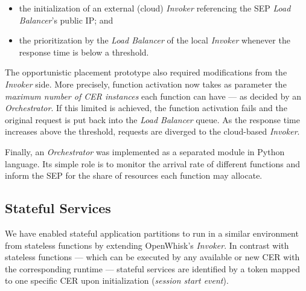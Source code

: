 \begin{itemize}
    \item the initialization of an external (cloud) \textit{Invoker} referencing the SEP \textit{Load Balancer}'s public IP; and
    
    \item the prioritization by the \textit{Load Balancer} of the local \textit{Invoker} whenever the response time is below a threshold. %
\end{itemize}

The opportunistic placement prototype also required modifications from the \textit{Invoker} side. More precisely, function activation now takes as parameter the \textit{maximum number of CER instances} each function can have --- as decided by an \textit{Orchestrator}. If this limited is achieved, the function activation fails and the original request is put back into the \textit{Load Balancer} queue. As the response time increases above the threshold, requests are diverged 
to the cloud-based \textit{Invoker}. 

Finally, an \textit{Orchestrator} was implemented as a separated module in Python language. Its simple role is to monitor the arrival rate of different functions and inform the SEP for the share of resources each function may allocate. 







\subsection{Stateful Services}

We have enabled stateful application partitions to run in a similar environment from stateless functions by extending OpenWhisk's \textit{Invoker}. In contrast with stateless functions --- which can be executed by any available or new CER with the corresponding runtime --- stateful services are identified by a token mapped to one specific CER upon initialization (\textit{session start event}). 

